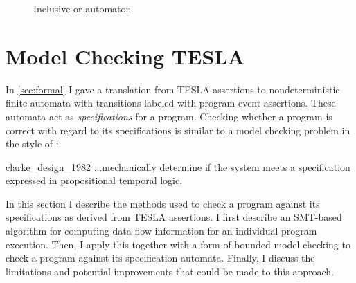 \begin{figure}
  \centering
  \caption{Inclusive-or automaton}
  \label{fig:disj-auto}
\end{figure}

\section{Model Checking TESLA} \label{sec:checking}

In \autoref{sec:formal} I gave a translation from TESLA assertions to
nondeterministic finite automata with transitions labeled with program
event assertions. These automata act as \emph{specifications} for a
program. Checking whether a program is correct with regard to its
specifications is similar to a model checking problem in the style of
\textcite{clarke_design_1982}:

\begin{displaycquote}[p. 2]{clarke_design_1982}
  ...mechanically determine if the system meets a specification expressed in
  propositional temporal logic.
\end{displaycquote}

In this section I describe the methods used to check a program against
its specifications as derived from TESLA assertions. I first describe an
SMT-based algorithm for computing data flow information for an
individual program execution. Then, I apply this together with a form of
bounded model checking to check a program against its specification
automata. Finally, I discuss the limitations and potential improvements
that could be made to this approach.

